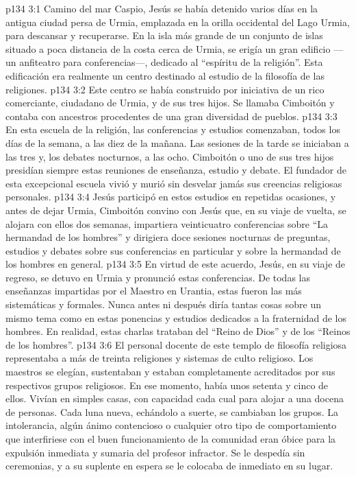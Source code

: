 \vs p134 3:1 Camino del mar Caspio, Jesús se había detenido varios días en la antigua ciudad persa de Urmia, emplazada en la orilla occidental del Lago Urmia, para descansar y recuperarse. En la isla más grande de un conjunto de islas situado a poca distancia de la costa cerca de Urmia, se erigía un gran edificio ---un anfiteatro para conferencias---, dedicado al “espíritu de la religión”. Esta edificación era realmente un centro destinado al estudio de la filosofía de las religiones.
\vs p134 3:2 Este centro se había construido por iniciativa de un rico comerciante, ciudadano de Urmia, y de sus tres hijos. Se llamaba Cimboitón y contaba con ancestros procedentes de una gran diversidad de pueblos.
\vs p134 3:3 En esta escuela de la religión, las conferencias y estudios comenzaban, todos los días de la semana, a las diez de la mañana. Las sesiones de la tarde se iniciaban a las tres y, los debates nocturnos, a las ocho. Cimboitón o uno de sus tres hijos presidían siempre estas reuniones de enseñanza, estudio y debate. El fundador de esta excepcional escuela vivió y murió sin desvelar jamás sus creencias religiosas personales.
\vs p134 3:4 Jesús participó en estos estudios en repetidas ocasiones, y antes de dejar Urmia, Cimboitón convino con Jesús que, en su viaje de vuelta, se alojara con ellos dos semanas, impartiera veinticuatro conferencias sobre “La hermandad de los hombres” y dirigiera doce sesiones nocturnas de preguntas, estudios y debates sobre sus conferencias en particular y sobre la hermandad de los hombres en general.
\vs p134 3:5 En virtud de este acuerdo, Jesús, en su viaje de regreso, se detuvo en Urmia y pronunció estas conferencias. De todas las enseñanzas impartidas por el Maestro en Urantia, estas fueron las más sistemáticas y formales. Nunca antes ni después diría tantas cosas sobre un mismo tema como en estas ponencias y estudios dedicados a la fraternidad de los hombres. En realidad, estas charlas trataban del “Reino de Dios” y de los “Reinos de los hombres”.
\vs p134 3:6 El personal docente de este templo de filosofía religiosa representaba a más de treinta religiones y sistemas de culto religioso. Los maestros se elegían, sustentaban y estaban completamente acreditados por sus respectivos grupos religiosos. En ese momento, había unos setenta y cinco de ellos. Vivían en simples casas, con capacidad cada cual para alojar a una docena de personas. Cada luna nueva, echándolo a suerte, se cambiaban los grupos. La intolerancia, algún ánimo contencioso o cualquier otro tipo de comportamiento que interfiriese con el buen funcionamiento de la comunidad eran óbice para la expulsión inmediata y sumaria del profesor infractor. Se le despedía sin ceremonias, y a su suplente en espera se le colocaba de inmediato en su lugar.
